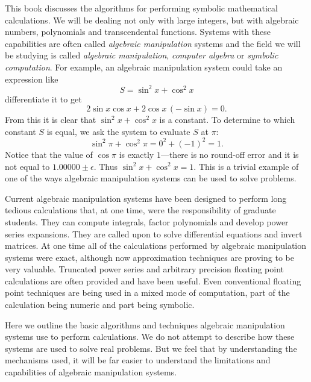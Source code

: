 This book discusses the algorithms for performing symbolic
mathematical calculations.  We will be dealing not only with large
integers, but with algebraic numbers, polynomials and transcendental
functions.  Systems with these capabilities are often called {\em
algebraic manipulation} systems and the field we will be studying is
called {\em algebraic manipulation\/}, {\em computer algebra} or {\em
symbolic computation}.  For example, an algebraic manipulation system
could take an expression like
\[
S = \sin^2 x + \cos^2 x
\]
differentiate it to get
\[
2 \sin x \cos x + 2 \cos x \, (- \sin x) = 0.
\]
From this it is clear that $\sin^2 x + \cos^2 x$ is a constant.  To
determine to which constant $S$ is equal, we ask the system to evaluate $S$
at $\pi$:
\[
\sin^2 \pi + \cos^2 \pi = 0^2 + (-1)^2 = 1.
\]
Notice that the value of $\cos \pi$ is exactly $1$---there is no
round-off error and it is not equal to $1.00000\pm\epsilon$.  Thus
$\sin^2 x + \cos^2 x = 1$.  This is a trivial example of one of the
ways algebraic manipulation systems can be used to solve problems.

Current algebraic manipulation systems have been designed to perform long
tedious calculations that, at one time, were the responsibility of graduate
students.  They can compute integrals, factor polynomials and develop power
series expansions.  They are called upon to solve differential equations
and invert matrices.  At one time all of the calculations performed by
algebraic manipulation systems were exact, although now approximation
techniques are proving to be very valuable.  Truncated power series and
arbitrary precision floating point calculations are often provided and have
been useful.  Even conventional floating point techniques are being used in
a mixed mode of computation, part of the calculation being numeric and part
being symbolic.

\medskip

Here we outline the basic algorithms and techniques algebraic manipulation
systems use to perform calculations.  We do not attempt to describe how
these systems are used to solve real problems.  But we feel that by
understanding the mechanisms used, it will be far easier to understand the
limitations and capabilities of algebraic manipulation systems.

